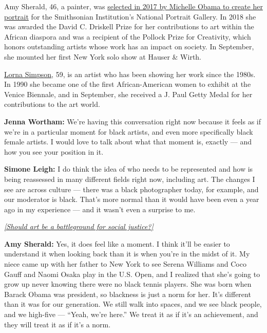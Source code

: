 Amy Sherald, 46, a painter, was
\href{https://www.newyorker.com/culture/annals-of-appearances/the-mystery-of-amy-sheralds-portrait-of-michelle-obama}{selected
in 2017 by Michelle Obama to create her portrait} for the Smithsonian
Institution's National Portrait Gallery. In 2018 she was awarded the
David C. Driskell Prize for her contributions to art within the African
diaspora and was a recipient of the Pollock Prize for Creativity, which
honors outstanding artists whose work has an impact on society. In
September, she mounted her first New York solo show at Hauser \& Wirth.

\href{https://www.nytimes3xbfgragh.onion/2019/06/13/arts/design/lorna-simpson-paintings-hauser-wirth.html}{Lorna
Simpson}, 59, is an artist who has been showing her work since the
1980s. In 1990 she became one of the first African-American women to
exhibit at the Venice Biennale, and in September, she received a J. Paul
Getty Medal for her contributions to the art world.

\textbf{Jenna Wortham:} We're having this conversation right now because
it feels as if we're in a particular moment for black artists, and even
more specifically black female artists. I would love to talk about what
that moment is, exactly --- and how you see your position in it.

\textbf{Simone Leigh:} I do think the idea of who needs to be
represented and how is being reassessed in many different fields right
now, including art. The changes I see are across culture --- there was a
black photographer today, for example, and our moderator is black.
That's more normal than it would have been even a year ago in my
experience --- and it wasn't even a surprise to me.

\href{https://www.nytimes3xbfgragh.onion/interactive/2018/10/03/magazine/morality-social-justice-art-entertainment.html}{\emph{{[}Should
art be a battleground for social justice?{]}}}

\textbf{Amy Sherald:} Yes, it does feel like a moment. I think it'll be
easier to understand it when looking back than it is when you're in the
midst of it. My niece came up with her father to New York to see Serena
Williams and Coco Gauff and Naomi Osaka play in the U.S. Open, and I
realized that she's going to grow up never knowing there were no black
tennis players. She was born when Barack Obama was president, so
blackness is just a norm for her. It's different than it was for our
generation. We still walk into spaces, and we see black people, and we
high-five --- ``Yeah, we're here.'' We treat it as if it's an
achievement, and they will treat it as if it's a norm.

